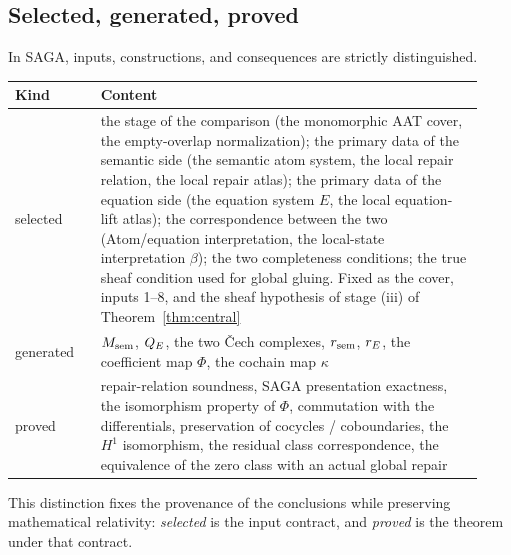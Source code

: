 \subsection{Selected, generated, proved}\label{sec:38}

In SAGA, inputs, constructions, and consequences are strictly
distinguished.

\begin{center}
\small
\begin{tabular}{@{}p{0.17\linewidth}p{0.76\linewidth}@{}}
\toprule
Kind & Content \\
\midrule
selected &
the stage of the comparison (the monomorphic AAT cover, the
empty-overlap normalization); the primary data of the semantic side (the
semantic atom system, the local repair relation, the local repair
atlas); the primary data of the equation side (the equation system $E$,
the local equation-lift atlas); the correspondence between the two
(Atom/equation interpretation, the local-state interpretation $\beta$);
the two completeness conditions; the true sheaf condition used for
global gluing. Fixed as the cover, inputs 1--8, and the sheaf
hypothesis of stage (iii) of Theorem~\ref{thm:central} \\
\addlinespace
generated &
$M_{\mathrm{sem}}$, $Q_{E}$, the two \v{C}ech complexes, $r_{\mathrm{sem}}$, $r_{E}$, the
coefficient map $\Phi$, the cochain map $\kappa$ \\
\addlinespace
proved &
repair-relation soundness, SAGA presentation exactness, the isomorphism
property of $\Phi$, commutation with the differentials, preservation of cocycles /
coboundaries, the $H^1$ isomorphism, the residual class correspondence,
the equivalence of the zero class with an actual global repair \\
\bottomrule
\end{tabular}
\end{center}

This distinction fixes the provenance of the conclusions while
preserving mathematical relativity: \emph{selected} is the input
contract, and \emph{proved} is the theorem under that contract.
